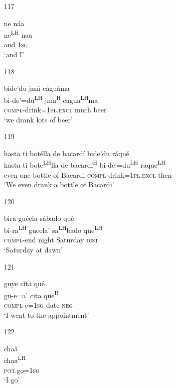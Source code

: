 \begin{itemize}
\item[117]

\glll ne n\'{a}a  \\
ne\textsuperscript{LH} naa  \\
and 1\textsc{sg}  \\
\glt  `and I'



\item[118]

\glll bide'du jm\'{a} c\'{a}gu\v{a}ma  \\
bi-de'=du\textsuperscript{LH} jma\textsuperscript{H} cagua\textsuperscript{LH}ma  \\
\textsc{compl}-drink=1\textsc{pl.excl} much beer  \\
\glt  `we drank lots of beer'  



\item[119]
 
\glll   hasta ti bot\'{e}lla de bacard\'{i} bide'du r\'{a}qu\v{e} \\
hasta ti bote\textsuperscript{LH}lla de bacard\'{i}\textsuperscript{H} bi-de'=du\textsuperscript{LH} raque\textsuperscript{LH} \\
even one bottle of Bacardi \textsc{compl}-drink=\textsc{1pl.excl} then \\
\glt `We even drank a bottle of Bacardi' 
 



\item[120]
 
\glll   bira gu\'{e}ela s\v{a}bado qu\v{e}   \\
 bi-ra\textsuperscript{LH} gueela' sa\textsuperscript{LH}bado que\textsuperscript{LH}  \\
\textsc{compl}-end night Saturday \textsc{dist} \\
\glt `Saturday at dawn'
 


\item[121]
 
\glll   guye c\v{i}ta qu\'{e}   \\
gu-e=a' cita que\textsuperscript{H}  \\
\textsc{compl}-e=\textsc{1sg} date \textsc{neg} \\
\glt `I went to the appointment'
 

\item[122]
 
\glll   cha\v{a}  \\
chaa\textsuperscript{LH} \\
\textsc{pot}.go=\textsc{1sg} \\
\glt `I go'
 



\end{itemize}
